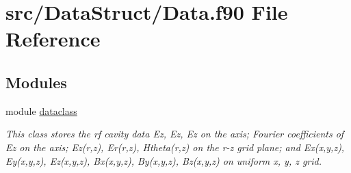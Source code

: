 \hypertarget{_data_8f90}{}\section{src/\+Data\+Struct/\+Data.f90 File Reference}
\label{_data_8f90}
\subsection*{Modules}
\begin{DoxyCompactItemize}
\item 
module \mbox{\hyperlink{namespacedataclass}{dataclass}}
\begin{DoxyCompactList}\small\item\em This class stores the rf cavity data Ez, Ez\textquotesingle{}, Ez\textquotesingle{}\textquotesingle{} on the axis; Fourier coefficients of Ez on the axis; Ez(r,z), Er(r,z), Htheta(r,z) on the r-\/z grid plane; and Ex(x,y,z), Ey(x,y,z), Ez(x,y,z), Bx(x,y,z), By(x,y,z), Bz(x,y,z) on uniform x, y, z grid. \end{DoxyCompactList}\end{DoxyCompactItemize}
